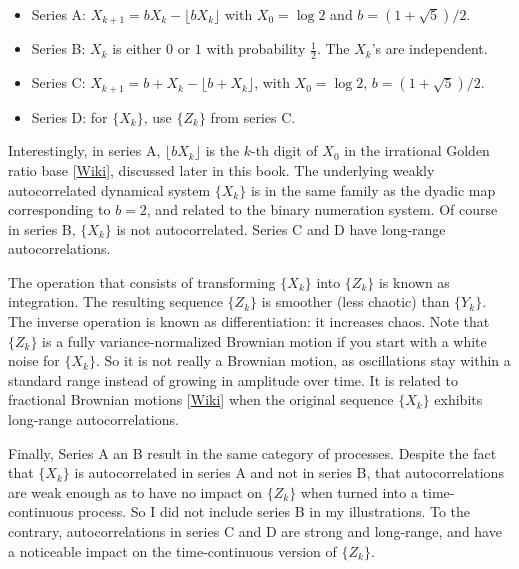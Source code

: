 \documentclass[oneside,10pt]{book}
\begin{document}
\begin{itemize}
\item[] Series A: $X_{k+1} = b X_k - \lfloor bX_k \rfloor$ with $X_0 = \log 2$ and $b = (1 + \sqrt{5})/2$.
\item[] Series B: $X_k$ is either $0$ or $1$ with probability $\frac{1}{2}$. The $X_k$'s are independent.
\item[] Series C: $X_{k+1} = b + X_k - \lfloor b + X_k \rfloor$, with $X_0 = \log 2$, $b = (1+\sqrt{5})/2$.
\item[] Series D: for $\{X_k\}$, use $\{Z_k\}$ from series C.
\end{itemize} \vspace{1ex}
 Interestingly, in series A,
 $\lfloor b X_k \rfloor$ is the $k$-th digit of $X_0$ in the irrational 
\textcolor{index}{Golden ratio base} [\href{https://en.wikipedia.org/wiki/Golden_ratio_base}{Wiki}], discussed later in this book.  The underlying 
 weakly autocorrelated dynamical system $\{X_k\}$ is in the same family as the
 \textcolor{index}{dyadic map} corresponding to $b=2$, and related to the binary numeration system. Of course in series B, $\{X_k\}$ is not autocorrelated. Series C and D have long-range autocorrelations.

The operation that consists of transforming $\{X_k\}$ into $\{Z_k\}$ is known as integration. The resulting sequence $\{Z_k\}$ is smoother (less chaotic) than
 $\{Y_k\}$. The inverse operation is known as differentiation: it increases chaos. Note that $\{Z_k\}$ is a fully variance-normalized Brownian motion if
 you start with a white noise for $\{X_k\}$. So it is not really a Brownian motion, as oscillations stay within a standard range instead of growing in amplitude over time. It is related to 
\textcolor{index}{fractional Brownian motions} 
[\href{https://en.wikipedia.org/wiki/Fractional_Brownian_motion}{Wiki}] when the original
 sequence $\{X_k\}$ exhibits long-range autocorrelations. 

Finally, Series A an B result in the same category of processes. 
Despite the fact that $\{X_k\}$ is autocorrelated in series A and not in series B, that autocorrelations are weak enough as to have no impact on $\{Z_k\}$ when turned into a time-continuous process. So I did not include series B in my illustrations. To the contrary,
 autocorrelations in series C and D are strong and long-range, and have a noticeable impact on the time-continuous version of
 $\{Z_k\}$.
\end{document}
